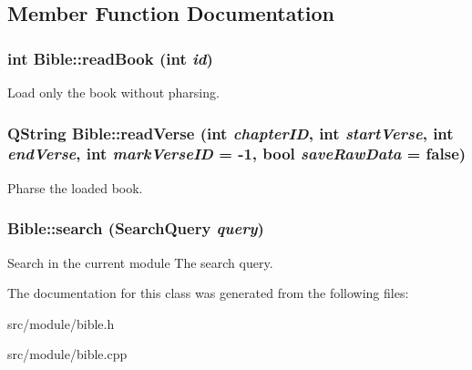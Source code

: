 \subsection{Member Function Documentation}
\hypertarget{classBible_a0057dd2ba35fe377624da860a6959cd9}{
\subsubsection[{readBook}]{\setlength{\rightskip}{0pt plus 5cm}int Bible::readBook (int {\em id})}}
\label{classBible_a0057dd2ba35fe377624da860a6959cd9}
Load only the book without pharsing. \hypertarget{classBible_a515418999329333e8a6a821fc88d006f}{
\subsubsection[{readVerse}]{\setlength{\rightskip}{0pt plus 5cm}QString Bible::readVerse (int {\em chapterID}, \/  int {\em startVerse}, \/  int {\em endVerse}, \/  int {\em markVerseID} = {\ttfamily -\/1}, \/  bool {\em saveRawData} = {\ttfamily false})}}
\label{classBible_a515418999329333e8a6a821fc88d006f}
Pharse the loaded book. \hypertarget{classBible_a33103e25381494250b9a351572bb4e8e}{
\subsubsection[{search}]{ Bible::search ({\bf SearchQuery} {\em query})}}
\label{classBible_a33103e25381494250b9a351572bb4e8e}
Search in the current module  The search query. 

The documentation for this class was generated from the following files:\begin{DoxyCompactItemize}
\item 
src/module/bible.h\item 
src/module/bible.cpp\end{DoxyCompactItemize}
